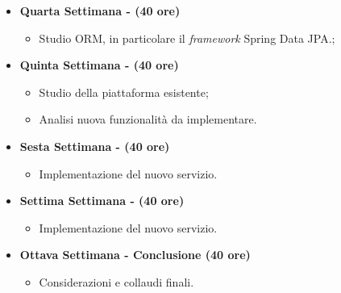 {\begin{itemize}
\begin{itemize}
            \item Studio servizi REST e \textit{framework} Spring Data REST;
            \item Studio ORM, in particolare il \textit{framework} Spring Data JPA.
        \end{itemize}
        \item \textbf{Quarta Settimana - (40 ore)} 
        \begin{itemize}
            \item Studio ORM, in particolare il \textit{framework} Spring Data JPA.;
        \end{itemize}
        \item \textbf{Quinta Settimana - (40 ore)} 
        \begin{itemize}
            \item Studio della piattaforma \productName esistente;
            \item Analisi nuova funzionalità da implementare.
        \end{itemize}
        \item \textbf{Sesta Settimana - (40 ore)} 
        \begin{itemize}
            \item Implementazione del nuovo servizio.
        \end{itemize}
        \item \textbf{Settima Settimana - (40 ore)} 
        \begin{itemize}
            \item Implementazione del nuovo servizio.
        \end{itemize}
        \item \textbf{Ottava Settimana - Conclusione (40 ore)} 
        \begin{itemize}
            \item Considerazioni e collaudi finali.
        \end{itemize}
    \end{itemize}
}


\newcommand{\obiettiviObbligatori}{
	 \item \underline{\textit{O01}}: Acquisizione competenze sulle tematiche sopra descritte;
	 \item \underline{\textit{O02}}: Capacità di raggiungere gli obiettivi richiesti in autonomia seguendo il cronoprogramma;
	 \item \underline{\textit{O03}}: Portare a termine l’implementazione dei \glspl{microservizio} richiesti con una percentuale di superamento pari al 80.
	 
}

\newcommand{\obiettiviDesiderabili}{
	 \item \underline{\textit{D01}}: Portare a termine l’implementazione dei \glspl{microservizio} richiesti con una percentuale di superamento pari al 100.
}

\newcommand{\obiettiviFacoltativi}{
	 \item \underline{\textit{F01}}: Utilizzo della containerizzazione per portare tutti i \glspl{microservizio} su Docker.
}


